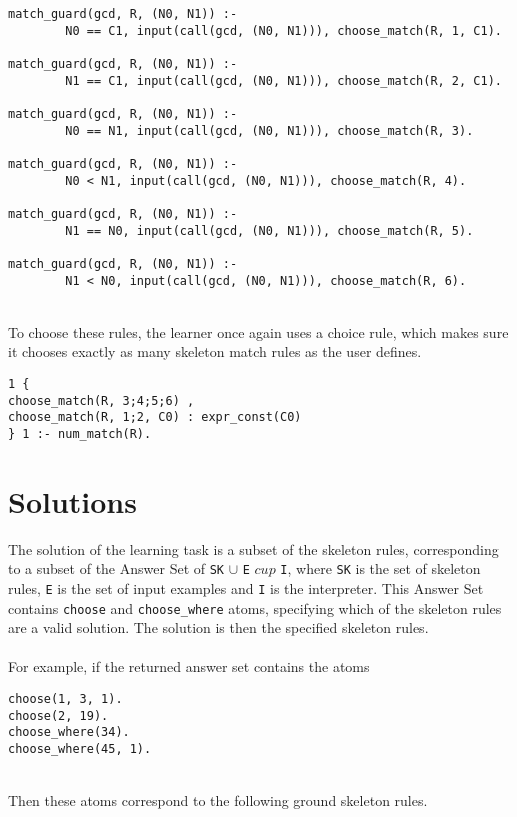 \begin{lstlisting}
match_guard(gcd, R, (N0, N1)) :- 
		N0 == C1, input(call(gcd, (N0, N1))), choose_match(R, 1, C1).
		
match_guard(gcd, R, (N0, N1)) :- 
		N1 == C1, input(call(gcd, (N0, N1))), choose_match(R, 2, C1).
		
match_guard(gcd, R, (N0, N1)) :- 
		N0 == N1, input(call(gcd, (N0, N1))), choose_match(R, 3).
		
match_guard(gcd, R, (N0, N1)) :- 
		N0 < N1, input(call(gcd, (N0, N1))), choose_match(R, 4).
		
match_guard(gcd, R, (N0, N1)) :- 
		N1 == N0, input(call(gcd, (N0, N1))), choose_match(R, 5).
		
match_guard(gcd, R, (N0, N1)) :- 
		N1 < N0, input(call(gcd, (N0, N1))), choose_match(R, 6).
\end{lstlisting}
\mbox{}\\
To choose these rules, the learner once again uses a choice rule, which makes sure it chooses exactly as many skeleton match rules as the user defines. \\

\begin{lstlisting}
1 {
choose_match(R, 3;4;5;6) ,
choose_match(R, 1;2, C0) : expr_const(C0)
} 1 :- num_match(R).
\end{lstlisting}

\section{Solutions}
The solution of the learning task is a subset of the skeleton rules, corresponding to a subset of the Answer Set of \lstinline!SK! $\cup$ \lstinline!E! $cup$ \lstinline!I!, where \lstinline!SK! is the set of skeleton rules, \lstinline!E! is the set of input examples and \lstinline!I! is the interpreter. This Answer Set contains \lstinline!choose! and \lstinline!choose_where! atoms, specifying which of the skeleton rules are a valid solution. The solution is then the specified skeleton rules. \\ \\
For example, if the returned answer set contains the atoms \\

\begin{lstlisting}
choose(1, 3, 1).
choose(2, 19).
choose_where(34).
choose_where(45, 1).
\end{lstlisting}
\mbox{}\\
Then these atoms correspond to the following ground skeleton rules.\\

